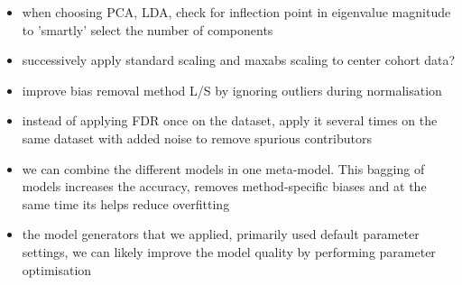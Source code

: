 \documentclass[a4paper,10pt]{article}
\begin{document}
\begin{itemize}
\item when choosing PCA, LDA, check for inflection point in eigenvalue magnitude to 'smartly' select the number of components
\item successively apply standard scaling and maxabs scaling to center cohort data?
\item improve bias removal method L/S by ignoring outliers during normalisation
\item instead of applying FDR once on the dataset, apply it several times on the same dataset with added noise to remove spurious contributors
\item we can combine the different models in one meta-model. This bagging of models increases the accuracy, removes method-specific biases and at the same time its helps reduce overfitting
\item the model generators that we applied, primarily used default parameter settings, we can likely improve the model quality by performing parameter optimisation
\end{itemize}



\end{document}
